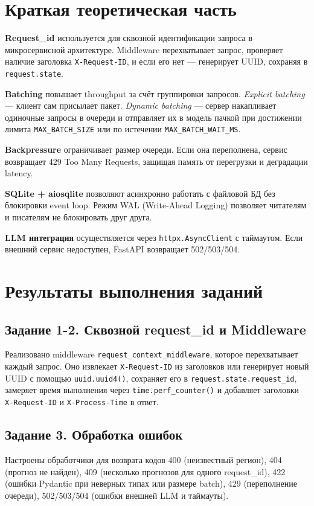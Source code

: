 \documentclass[12pt,a4paper]{article}
\begin{document}
\section{Краткая теоретическая часть}

\textbf{Request\_id} используется для сквозной идентификации запроса в микросервисной архитектуре. Middleware перехватывает запрос, проверяет наличие заголовка \texttt{X-Request-ID}, и если его нет — генерирует UUID, сохраняя в \texttt{request.state}.

\textbf{Batching} повышает throughput за счёт группировки запросов. \textit{Explicit batching} — клиент сам присылает пакет. \textit{Dynamic batching} — сервер накапливает одиночные запросы в очереди и отправляет их в модель пачкой при достижении лимита \texttt{MAX\_BATCH\_SIZE} или по истечении \texttt{MAX\_BATCH\_WAIT\_MS}.

\textbf{Backpressure} ограничивает размер очереди. Если она переполнена, сервис возвращает 429 Too Many Requests, защищая память от перегрузки и деградации latency.

\textbf{SQLite + aiosqlite} позволяют асинхронно работать с файловой БД без блокировки event loop. Режим WAL (Write-Ahead Logging) позволяет читателям и писателям не блокировать друг друга.

\textbf{LLM интеграция} осуществляется через \texttt{httpx.AsyncClient} с таймаутом. Если внешний сервис недоступен, FastAPI возвращает 502/503/504.

\section{Результаты выполнения заданий}

\subsection{Задание 1-2. Сквозной request\_id и Middleware}
Реализовано middleware \texttt{request\_context\_middleware}, которое перехватывает каждый запрос. Оно извлекает \texttt{X-Request-ID} из заголовков или генерирует новый UUID с помощью \texttt{uuid.uuid4()}, сохраняет его в \texttt{request.state.request\_id}, замеряет время выполнения через \texttt{time.perf\_counter()} и добавляет заголовки \texttt{X-Request-ID} и \texttt{X-Process-Time} в ответ.

\subsection{Задание 3. Обработка ошибок}
Настроены обработчики для возврата кодов 400 (неизвестный регион), 404 (прогноз не найден), 409 (несколько прогнозов для одного request\_id), 422 (ошибки Pydantic при неверных типах или размере batch), 429 (переполнение очереди), 502/503/504 (ошибки внешней LLM и таймауты).
\end{document}
